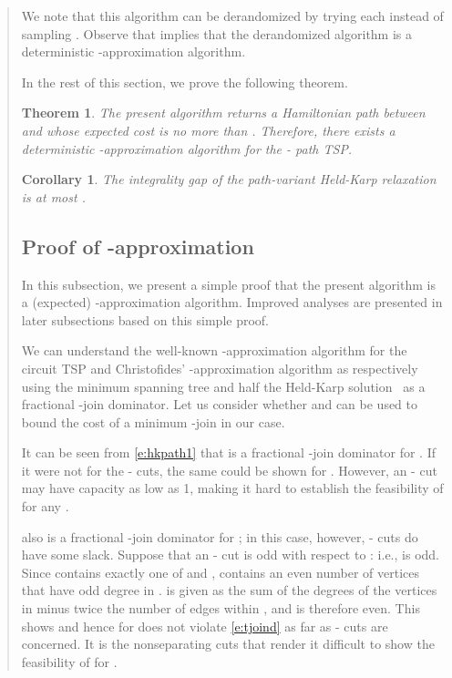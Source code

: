 \documentclass[11pt,letterpaper]{article}
\newtheorem{thm}{Theorem}
\newtheorem{cor}{Corollary}
\newcommand{\st}{\mbox{-} }
\begin{document}
\begin{quote}
We note that this algorithm can be derandomized by trying each  instead of sampling . Observe that  implies that the derandomized algorithm is a deterministic -approximation algorithm.

In the rest of this section, we prove the following theorem.

\begin{thm}\label{t:main}
The present algorithm returns a Hamiltonian path between  and  whose expected cost is no more than . Therefore, there exists a deterministic -approximation algorithm for the \st path TSP.
\end{thm}

\begin{cor}\label{c:ig}
The integrality gap of the path-variant Held-Karp relaxation is at most .
\end{cor}

\subsection{Proof of -approximation}

In this subsection, we present a simple proof that the present algorithm is a (expected) -approximation algorithm. Improved analyses are presented in later subsections based on this simple proof.

We can understand the well-known -approximation algorithm for the circuit TSP and Christofides' -approximation algorithm as respectively using the minimum spanning tree and half the Held-Karp solution~\cite{W, SW} as a fractional -join dominator. Let us consider whether  and  can be used to bound the cost of a minimum -join in our case.

It can be seen from \eqref{e:hkpath1} that  is a fractional -join dominator for . If it were not for the \st cuts, the same could be shown for . However, an \st cut may have capacity as low as 1, making it hard to establish the feasibility of  for any .

 also is a fractional -join dominator for ; in this case, however, \st cuts do have some slack. Suppose that an \st cut  is odd with respect to : i.e.,  is odd. Since  contains exactly one of  and ,  contains an even number of vertices that have odd degree in .  is given as the sum of the degrees of the vertices in  minus twice the number of edges within , and is therefore even. This shows  and hence  for  does not violate \eqref{e:tjoind} as far as \st cuts are concerned. It is the nonseparating cuts that render it difficult to show the feasibility of  for .


\end{quote}
\end{document}
